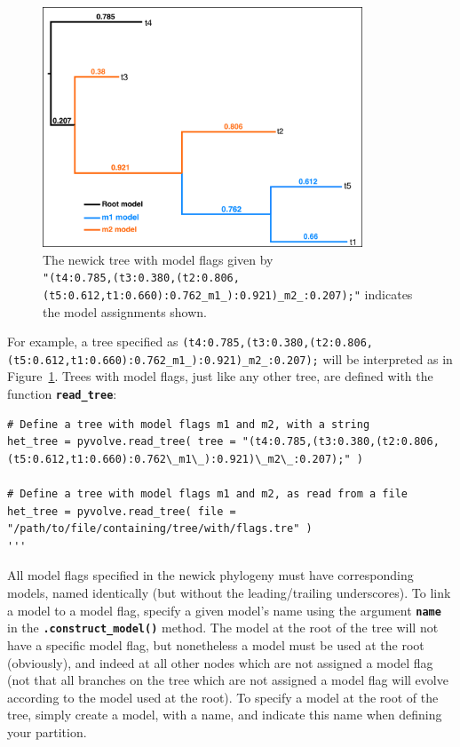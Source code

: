 \documentclass{article}
\newcommand{\code}[1]{\textbf{\texttt{\small{#1}}}}
\begin{document}
\begin{figure}[htpb]%
	\includegraphics[width=3.75in]{treeflags.pdf}
	\caption{\label{fig:treeflags} The newick tree with model flags given by \\ \texttt{\scriptsize{"(t4:0.785,(t3:0.380,(t2:0.806,(t5:0.612,t1:0.660):0.762\_m1\_):0.921)\_m2\_:0.207);"}}
		indicates the model assignments shown.}
\end{figure}

For example, a tree specified as  \texttt{\scriptsize{(t4:0.785,(t3:0.380,(t2:0.806,(t5:0.612,t1:0.660):0.762\_m1\_):0.921)\_m2\_:0.207);}} will be interpreted as in Figure~\ref{fig:treeflags}. Trees with model flags, just like any other tree, are defined with the function \code{read\_tree}:
\begin{lstlisting}
# Define a tree with model flags m1 and m2, with a string
het_tree = pyvolve.read_tree( tree = "(t4:0.785,(t3:0.380,(t2:0.806,(t5:0.612,t1:0.660):0.762\_m1\_):0.921)\_m2\_:0.207);" )

# Define a tree with model flags m1 and m2, as read from a file
het_tree = pyvolve.read_tree( file = "/path/to/file/containing/tree/with/flags.tre" )
'''
\end{lstlisting}


All model flags specified in the newick phylogeny must have corresponding models, named identically (but without the leading/trailing underscores). To link a model to a model flag, specify a given model's name using the argument \code{name} in the \code{.construct\_model()} method. The model at the root of the tree will not have a specific model flag, but nonetheless a model must be used at the root (obviously), and indeed at all other nodes which are not assigned a model flag (not that all branches on the tree which are not assigned a model flag will evolve according to the model used at the root). To specify a model at the root of the tree, simply create a model, with a name, and indicate this name when defining your partition.
\end{document}
